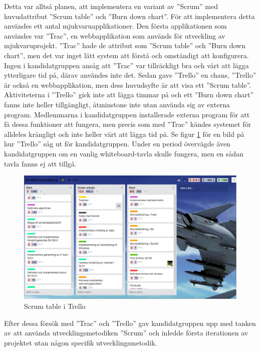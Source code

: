 Detta var alltså planen, att implementera en variant av ''Scrum'' med huvudattribut ''Scrum table'' och ''Burn down chart''. För att implementera detta användes ett antal mjukvaruapplikationer. Den första applikationen som användes var ''Trac'', en webbapplikation som används för utveckling av mjukvaruprojekt. ''Trac'' hade de attribut som ''Scrum table'' och ''Burn down chart'', men det var  inget lätt system att förstå och omständigt att konfigurera. Ingen i kandidatgruppen ansåg att ''Trac'' var tillräckligt bra och värt att lägga ytterligare tid på, därav användes inte det. Sedan gavs ''Trello'' en chans, ''Trello'' är också en webbapplikation, men dess huvudsyfte är att visa ett ''Scrum table''. Aktiviteterna i ''Trello'' gick inte att lägga timmar på och ett ''Burn down chart'' fanns inte heller tillgängligt, åtminstone inte utan använda sig av externa program. Medlemmarna i kandidatgruppen installerade externa program för att få dessa funktioner att fungera, men precis som med ''Trac'' kändes systemet för alldeles krångligt och inte heller värt att lägga tid på. Se figur \ref{fig:trello} för en bild på hur ''Trello'' såg ut för kandidatgruppen. Under en period övervägde även kandidatgruppen om en vanlig whiteboard-tavla skulle fungera, men en sådan tavla fanns ej att tillgå.

\begin{figure}[H]
\centerline{\includegraphics[scale=0.35]{grafik/trello}}
\caption{Scrum table i Trello}
\label{fig:trello}
\end{figure}

\noindent Efter dessa försök med ''Trac'' och ''Trello'' gav kandidatgruppen upp med tanken av att använda utvecklingsmetodiken ''Scrum'' och inledde första iterationen av projektet utan någon specifik utvecklingsmetodik.

